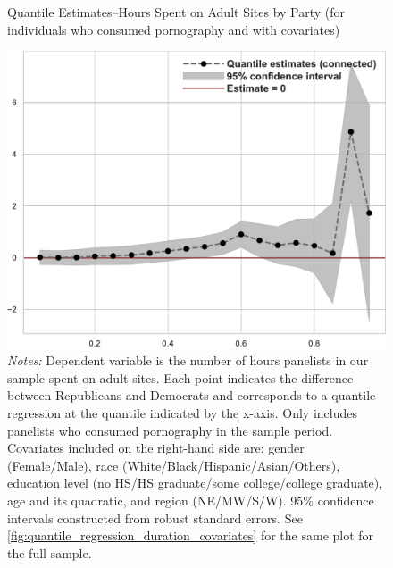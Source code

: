\documentclass[12pt, letterpaper]{article}
\begin{document}
\begin{figure}[ht]
	\centering
	\caption{Quantile Estimates--Hours Spent on Adult Sites by Party (for individuals who consumed pornography and with covariates)}
	\includegraphics[width=.55\linewidth]{../figs/quantile_reg_nonzero_covariates_duration_adult.pdf}
	\caption*{\footnotesize \emph{Notes:} 
		Dependent variable is the number of hours panelists in our sample spent on adult sites.
		Each point indicates the difference between Republicans and Democrats and corresponds to a quantile regression at the quantile indicated by the x-axis.
		Only includes panelists who consumed pornography in the sample period.
		Covariates included on the right-hand side are: gender (Female/Male), race (White/Black/Hispanic/Asian/Others), education level (no HS/HS graduate/some college/college graduate), age and its quadratic, and region (NE/MW/S/W).
		95\% confidence intervals constructed from robust standard errors.
		See \cref{fig:quantile_regression_duration_covariates} for the same plot for the full sample.
	}
	\label{fig:quantile_regression_duration_nonzeroes_covariates}
\end{figure}
\end{document}
